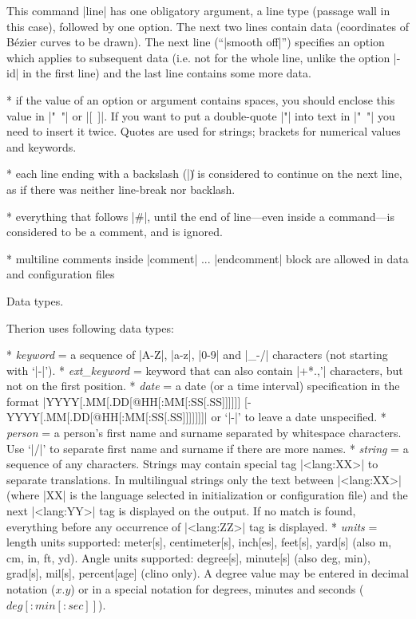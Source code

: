This command |line| has one obligatory argument, a line type (passage wall in
this case), followed by one option. The next two lines contain data (coordinates of
B\'ezier curves to be drawn). The next line (``|smooth off|'') specifies an option which
applies to subsequent data (i.e. not for the whole line, unlike the option |-id|
in the first line) and the last line contains some more data.

* if the value of an option or argument contains spaces, you should enclose this
  value in \hbox{|" "|} or \hbox{|[ ]|}. If you want to put a double-quote |"| into
  text in \hbox{|" "|} you need to insert it twice. Quotes are used for strings;
  brackets for numerical values and keywords.

* each line ending with a backslash (|\|) is considered to continue on
  the next line, as if there was neither line-break nor backlash.

* everything that follows |#|, until the end of line---even inside a command---is
  considered to be a comment, and is ignored.

* multiline comments inside |comment| ... |endcomment| block are allowed in
  data and configuration files

\endlist


\subchapter Data types.

Therion uses following data types:

\list
* {\it keyword} = a sequence of |A-Z|, |a-z|, |0-9| and |_-/| characters
             (not starting with `|-|').
* {\it ext\_keyword} = keyword that can also contain |+*.,'| characters,
            but not on the first position.
* {\it date} = a date (or a time interval) specification in the format\hfil\break
          |YYYY[.MM[.DD[@HH[:MM[:SS[.SS]]]]]] [- YYYY[.MM[.DD[@HH[:MM[:SS[.SS]]]]]]]| or `|-|'
          to leave a date unspecified.
* {\it person} = a person's first name and surname separated by whitespace characters.
            Use `|/|' to separate first name and surname if there are
            more names.
* {\it string} = a sequence of any characters.
    Strings may contain special tag |<lang:XX>| to separate
    translations.
    In multilingual strings only the text between |<lang:XX>|
    (where |XX| is the language selected in initialization
    or configuration file) and the next |<lang:YY>|
    tag is displayed on the output.
    If no match is found, everything before any occurrence of
    |<lang:ZZ>| tag is displayed.
* {\it units} = length units supported:
           meter[s], centimeter[s], inch[es], feet[s], yard[s]
           (also m, cm, in, ft, yd).
           Angle units supported: degree[s], minute[s] (also deg, min),
	   grad[s], mil[s], percent[age] (clino only).
           A degree value may be entered in decimal notation
	   ($x.y$) or in a special notation for degrees, minutes and seconds
	   ($deg[{:}min[{:}sec]]$).
\endlist




